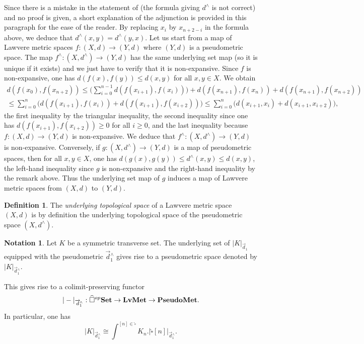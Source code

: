 \documentclass[a4paper,12pt]{amsart}
\renewcommand{\vec}{\overrightarrow}
\theoremstyle{definition}
\newtheorem{defn}[thm]{Definition}
\newcommand{\bd}{\begin{defn}}
\newcommand{\ed}{\end{defn}}
\newtheorem{nota}[thm]{Notation}
\newcommand{\iso}{\cong}
\renewcommand{\leq}{\leqslant}
\renewcommand{\geq}{\geqslant}
\newcommand{\brm}[1]{{\rm{\mathbf{#1}}}}
\newcommand{\set}{{\brm{Set}}}
\newcommand{\vd}{\vec{d}\!_1}
\newcommand{\LMet}{\mathbf{LvMet}}
\newcommand{\SLMet}{\mathbf{PseudoMet}}
\begin{document}
Since there is a mistake in the statement of \cite[Proposition~3.21]{zbMATH07226006} (the formula giving $d^\wedge$ is not correct) and no proof is given, a short explanation of the adjunction is provided in this paragraph for the ease of the reader. By replacing $x_i$ by $x_{n+2-i}$ in the formula above, we deduce that $d^\wedge(x,y)=d^\wedge(y,x)$. Let us start from a map of Lawvere metric spaces $f:(X,d)\to (Y,d)$ where $(Y,d)$ is a pseudometric space. The map $f^\wedge:(X,d^\wedge)\to (Y,d)$ has the same underlying set map (so it is unique if it exists) and we just have to verify that it is non-expansive. Since $f$ is non-expansive, one has $d(f(x),f(y))\leq d(x,y)$ for all $x,y\in X$. We obtain 
\begin{multline*}
	d(f(x_0),f(x_{n+2})) \leq \bigg(\sum_{i=0}^{n-1} d(f(x_{i+1}),f(x_i))\bigg) + d(f(x_{n+1}),f(x_n)) + d(f(x_{n+1}),f(x_{n+2}))\\\leq \sum_{i=0}^{n} \bigg(d(f(x_{i+1}),f(x_i)) + d(f(x_{i+1}),f(x_{i+2}))\bigg) \leq \sum_{i=0}^{n} \bigg(d(x_{i+1},x_i) + d(x_{i+1},x_{i+2})\bigg),
\end{multline*}
the first inequality by the triangular inequality, the second inequality since one has $d(f(x_{i+1}),f(x_{i+2}))\geq 0$ for all $i\geq 0$, and the last inequality because $f:(X,d)\to (Y,d)$ is non-expansive. We deduce that $f^\wedge:(X,d^\wedge)\to (Y,d)$ is non-expansive. Conversely, if $g:(X,d^\wedge)\to (Y,d)$ is a map of pseudometric spaces, then for all $x,y\in X$, one has $d(g(x),g(y)) \leq d^\wedge(x,y)\leq d(x,y)$, the left-hand inequality since $g$ is non-expansive and the right-hand inequality by the remark above. Thus the underlying set map of $g$ induces a map of Lawvere metric spaces from $(X,d)$ to $(Y,d)$.

\bd
The \textit{underlying topological space} of a Lawvere metric space $(X,d)$ is by definition the underlying topological space of the pseudometric space $(X,d^\wedge)$. 
\ed


\begin{nota}
	Let $K$ be a symmetric transverse set. The underlying set of $|K|_{\vd}$ equipped with the pseudometric $\vd^\wedge$ gives rise to a pseudometric space denoted by $|K|_{\vd^\wedge}$. 
\end{nota}

This gives rise to a colimit-preserving functor \[|-|_{\vd^\wedge}:\widehat{\square}^{op}\set \to \LMet \to \SLMet.\] In particular, one has 
\[
|K|_{\vd^\wedge} \iso \int^{[n]\in \widehat{\square}} K_n.|\widehat{\square}[n]|_{\vd^\wedge}.
\]
\end{document}
